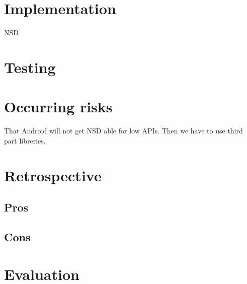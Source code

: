\section{Implementation}

NSD
\section{Testing}

\section{Occurring risks}

That Android will not get NSD able for low APIs. 
Then we have to use third part libreries.

\section{Retrospective}
\subsection{Pros}
\subsection{Cons}
\section{Evaluation}
